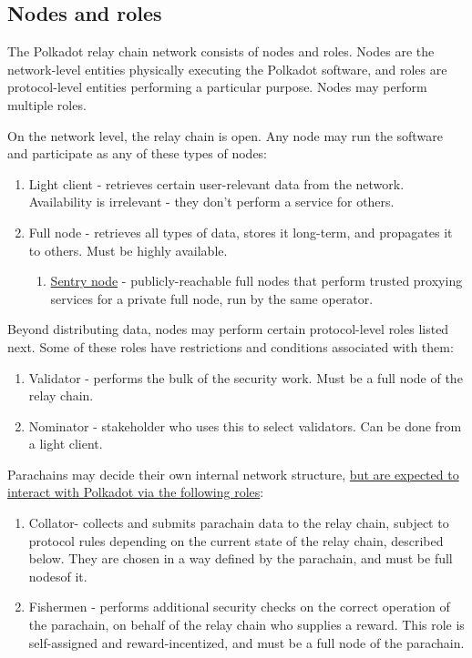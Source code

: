 \subsection{Nodes and roles}

The Polkadot relay chain network consists of nodes and roles. Nodes are the network-level entities physically executing the Polkadot software, and roles are protocol-level entities performing a particular purpose. Nodes may perform multiple roles.

On the network level, the relay chain is open. Any node may run the software and participate as any of these types of nodes:

\begin{enumerate}
\item Light client - retrieves certain user-relevant data from the network. Availability is irrelevant - they don't perform a service for others.
\item Full node - retrieves all types of data, stores it long-term, and propagates it to others. Must be highly available.
  \begin{enumerate}
  \item \hyperref[sec:net_sentry]{Sentry node} - publicly-reachable full nodes that perform trusted proxying services for a private full node, run by the same operator.
  \end{enumerate}
\end{enumerate}

Beyond distributing data, nodes may perform certain protocol-level roles listed next. Some of these roles have restrictions and conditions associated with them:

\begin{enumerate}
\item Validator - performs the bulk of the security work. Must be a full node of the relay chain.
\item Nominator - stakeholder who uses this to select validators. Can be done from a light client.
\end{enumerate}

Parachains may decide their own internal network structure, \uline{but are expected to interact with Polkadot via the following roles}:

\begin{enumerate}
\item Collator\footnotemark[1] - collects and submits parachain data to the relay chain, subject to protocol rules depending on the current state of the relay chain, described below. They are chosen in a way defined by the parachain, and must be full nodes\footnotemark[2] of it.
\item Fishermen - performs additional security checks on the correct operation of the parachain, on behalf of the relay chain who supplies a reward. This role is self-assigned and reward-incentized, and must be a full node of the parachain.
\end{enumerate}

